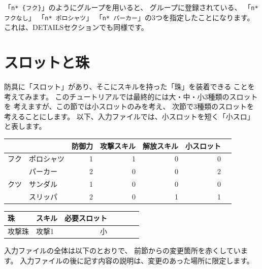 \documentclass[dvipdfmx]{jsarticle}
\begin{document}
「\texttt{n* \{フク\}}」のようにグループを用いると、
グループに登録されている、
「\texttt{n* フクなし}」
「\texttt{n* ポロシャツ}」
「\texttt{n* パーカー}」の3つを指定したことになります。
これは、DETAILSセクションでも同様です。

\section{スロットと珠} %
防具に「スロット」があり、そこにスキルを持った「珠」を装着できる
ことを考えてみます。
%
このチュートリアルでは最終的には大・中・小3種類のスロットを
考えますが、この節では小スロットのみを考え、
次節で3種類のスロットを考えることにします。
%
以下、入力ファイルでは、小スロットを短く「小スロ」と表します。
%
\begin{center}
\begin{tabular}{llrrrrr}
\toprule
&& 防御力 & 攻撃スキル & 解放スキル & 小スロット\\
\midrule
フク
& ポロシャツ & 1 & 1 & 0 & 0\\
& パーカー   & 2 & 0 & 0 & 2\\
\midrule
クツ
& サンダル & 1 & 0 & 0 & 0\\
& スリッパ & 2 & 0 & 1 & 1\\
\bottomrule
\end{tabular}
\end{center}
%
\begin{center}
\begin{tabular}{llrrrrr}
\toprule
珠 & スキル & 必要スロット \\
\midrule
攻撃珠 & 攻撃1 & 小\\
\bottomrule
\end{tabular}
\end{center}
%
入力ファイルの全体は以下のとおりで、
前節からの変更箇所を赤くしています。
入力ファイルの後に記す内容の説明は、変更のあった場所に限定します。
\medskip
\end{document}
